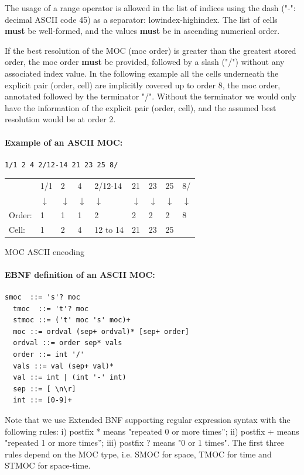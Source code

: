 \documentclass[11pt,a4paper]{ivoa}
\begin{document}
The usage of a range operator is allowed in the list of indices using the
dash ("-": decimal ASCII code 45) as a separator: lowindex-highindex.
The list of cells {\bf must} be well-formed, and the values {\bf must}
be in ascending numerical order.

If the best resolution of the MOC (moc order) is greater than the
greatest stored order, the moc order {\bf must} be provided, followed
by a slash ("/") without any associated index value.
In the following example all the
cells underneath the explicit pair (order, cell) are implicitly covered
up to order 8, the moc order, annotated followed by the terminator "/".
Without the terminator we would only have the information of the explicit
pair (order, cell), and the assumed best resolution would be at order 2.   


\paragraph{Example of an ASCII MOC:}
\begin{lstlisting}[]
    1/1 2 4 2/12-14 21 23 25 8/
\end{lstlisting}

\begin{center}
  {\small
  \begin{tabular} { l l l l l l l l l }
   & 1/1   & 2  & 4  & 2/12-14 & 21 & 23 &  25 & 8/ \\
   & $\downarrow$ & $\downarrow$ & $\downarrow$ & $\downarrow$ & $\downarrow$ & $\downarrow$ & $\downarrow$ & $\downarrow$ \\
Order:     & 1    & 1 & 1 & 2        & 2  &  2 & 2  & 8 \\
Cell:      & 1    & 2 & 4 & 12 to 14 & 21 & 23 & 25 & \\
\end{tabular}}
MOC ASCII encoding
\end{center}


\paragraph{EBNF definition of an ASCII MOC:}
\begin{lstlisting}[]
  smoc  ::= 's'? moc
  tmoc  ::= 't'? moc
  stmoc ::= ('t' moc 's' moc)+
  moc ::= ordval (sep+ ordval)* [sep+ order]
  ordval ::= order sep* vals
  order ::= int '/'
  vals ::= val (sep+ val)*
  val ::= int | (int '-' int)
  sep ::= [ \n\r]
  int ::= [0-9]+
\end{lstlisting}
Note that we use Extended BNF supporting regular expression
syntax with the following rules: i) postfix * means "repeated
0 or more times”; ii) postfix + means "repeated 1 or more
times”; iii) postfix ? means "0 or 1 times". The first three
rules depend on the MOC type, i.e. SMOC for space, TMOC for
time and STMOC for space-time. 
\end{document}
